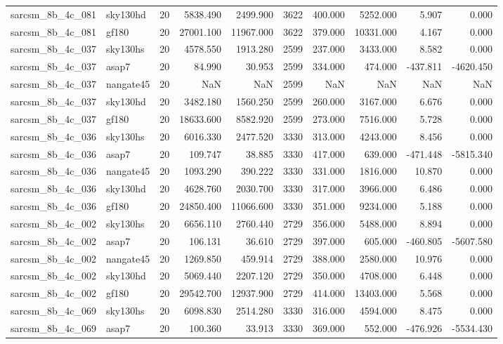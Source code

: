 \documentclass{article}
\begin{document}
\begin{longtable}{llrrrrrrrr}
sarcsm\_8b\_4c\_081 & sky130hd & 20 & 5838.490 & 2499.900 & 3622 & 400.000 & 5252.000 & 5.907 & 0.000 \\
sarcsm\_8b\_4c\_081 & gf180 & 20 & 27001.100 & 11967.000 & 3622 & 379.000 & 10331.000 & 4.167 & 0.000 \\
sarcsm\_8b\_4c\_037 & sky130hs & 20 & 4578.550 & 1913.280 & 2599 & 237.000 & 3433.000 & 8.582 & 0.000 \\
sarcsm\_8b\_4c\_037 & asap7 & 20 & 84.990 & 30.953 & 2599 & 334.000 & 474.000 & -437.811 & -4620.450 \\
sarcsm\_8b\_4c\_037 & nangate45 & 20 & NaN & NaN & 2599 & NaN & NaN & NaN & NaN \\
sarcsm\_8b\_4c\_037 & sky130hd & 20 & 3482.180 & 1560.250 & 2599 & 260.000 & 3167.000 & 6.676 & 0.000 \\
sarcsm\_8b\_4c\_037 & gf180 & 20 & 18633.600 & 8582.920 & 2599 & 273.000 & 7516.000 & 5.728 & 0.000 \\
sarcsm\_8b\_4c\_036 & sky130hs & 20 & 6016.330 & 2477.520 & 3330 & 313.000 & 4243.000 & 8.456 & 0.000 \\
sarcsm\_8b\_4c\_036 & asap7 & 20 & 109.747 & 38.885 & 3330 & 417.000 & 639.000 & -471.448 & -5815.340 \\
sarcsm\_8b\_4c\_036 & nangate45 & 20 & 1093.290 & 390.222 & 3330 & 331.000 & 1816.000 & 10.870 & 0.000 \\
sarcsm\_8b\_4c\_036 & sky130hd & 20 & 4628.760 & 2030.700 & 3330 & 317.000 & 3966.000 & 6.486 & 0.000 \\
sarcsm\_8b\_4c\_036 & gf180 & 20 & 24850.400 & 11066.600 & 3330 & 351.000 & 9234.000 & 5.188 & 0.000 \\
sarcsm\_8b\_4c\_002 & sky130hs & 20 & 6656.110 & 2760.440 & 2729 & 356.000 & 5488.000 & 8.894 & 0.000 \\
sarcsm\_8b\_4c\_002 & asap7 & 20 & 106.131 & 36.610 & 2729 & 397.000 & 605.000 & -460.805 & -5607.580 \\
sarcsm\_8b\_4c\_002 & nangate45 & 20 & 1269.850 & 459.914 & 2729 & 388.000 & 2580.000 & 10.976 & 0.000 \\
sarcsm\_8b\_4c\_002 & sky130hd & 20 & 5069.440 & 2207.120 & 2729 & 350.000 & 4708.000 & 6.448 & 0.000 \\
sarcsm\_8b\_4c\_002 & gf180 & 20 & 29542.700 & 12937.900 & 2729 & 414.000 & 13403.000 & 5.568 & 0.000 \\
sarcsm\_8b\_4c\_069 & sky130hs & 20 & 6098.830 & 2514.280 & 3330 & 316.000 & 4594.000 & 8.475 & 0.000 \\
sarcsm\_8b\_4c\_069 & asap7 & 20 & 100.360 & 33.913 & 3330 & 369.000 & 552.000 & -476.926 & -5534.430 \\

\end{longtable}
\end{document}
